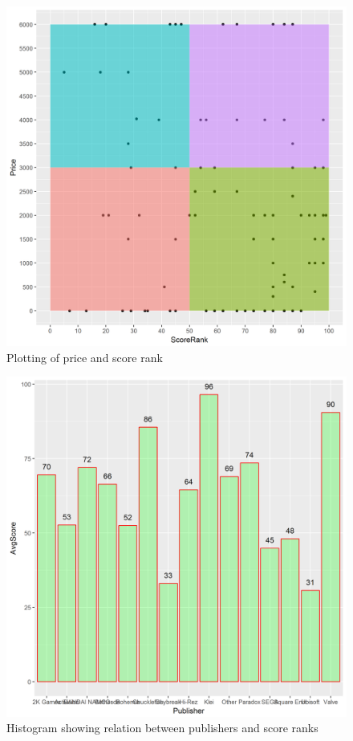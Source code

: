 \documentclass[figures_tabs.tex]{subfiles}
\begin{document}
\begin{figure}[H]
    \centering
    \includegraphics[scale=0.5]{img/score_price.png}
    \caption{Plotting of price and score rank}
    \label{fig:score_price}
\end{figure}

\begin{figure}[H]
    \centering
    \includegraphics[scale=0.5]{img/publishers.png}
    \caption{Histogram showing relation between publishers and score ranks}
    \label{fig:publishers}
\end{figure}
\end{document}
